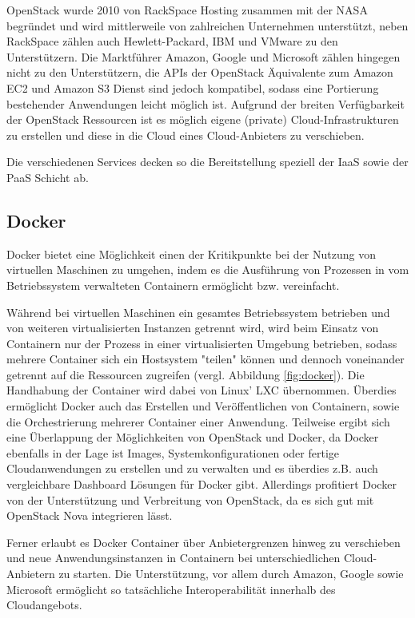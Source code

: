 OpenStack wurde 2010 von RackSpace Hosting zusammen mit der NASA begründet und wird mittlerweile von zahlreichen Unternehmen unterstützt, neben RackSpace zählen auch Hewlett-Packard, IBM und VMware zu den Unterstützern. Die Marktführer Amazon, Google und Microsoft zählen hingegen nicht zu den Unterstützern, die APIs der OpenStack Äquivalente zum Amazon EC2 und Amazon S3 Dienst sind jedoch kompatibel, sodass eine Portierung bestehender Anwendungen leicht möglich ist. Aufgrund der breiten Verfügbarkeit der OpenStack Ressourcen ist es möglich eigene (private) Cloud-Infrastrukturen zu erstellen und diese in die Cloud eines Cloud-Anbieters zu verschieben.

Die verschiedenen Services decken so die Bereitstellung speziell der IaaS sowie der PaaS Schicht ab.

\subsection{Docker}
Docker bietet eine Möglichkeit einen der Kritikpunkte bei der Nutzung von virtuellen Maschinen zu umgehen, indem es die Ausführung von Prozessen in vom Betriebssystem verwalteten Containern ermöglicht bzw. vereinfacht.

Während bei virtuellen Maschinen ein gesamtes Betriebssystem betrieben und von weiteren virtualisierten Instanzen getrennt wird, wird beim Einsatz von Containern nur der Prozess in einer virtualisierten Umgebung betrieben, sodass mehrere Container sich ein Hostsystem "teilen" können und dennoch voneinander getrennt auf die Ressourcen zugreifen (vergl. Abbildung \ref{fig:docker}). Die Handhabung der Container wird dabei von Linux' LXC übernommen. Überdies ermöglicht Docker auch das Erstellen und Veröffentlichen von Containern, sowie die Orchestrierung mehrerer Container einer Anwendung. Teilweise ergibt sich eine Überlappung der Möglichkeiten von OpenStack und Docker, da Docker ebenfalls in der Lage ist Images, Systemkonfigurationen oder fertige Cloudanwendungen zu erstellen und zu verwalten und es überdies z.B. auch vergleichbare Dashboard Lösungen für Docker gibt. Allerdings profitiert Docker von der Unterstützung und Verbreitung von OpenStack, da es sich gut mit OpenStack Nova integrieren lässt.

Ferner erlaubt es Docker Container über Anbietergrenzen hinweg zu verschieben und neue Anwendungsinstanzen in Containern bei unterschiedlichen Cloud-Anbietern zu starten. Die Unterstützung, vor allem durch Amazon, Google sowie Microsoft ermöglicht so tatsächliche Interoperabilität innerhalb des Cloudangebots.

